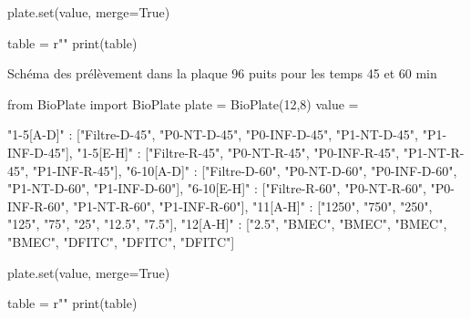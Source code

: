 \begin{enumerate}
\begin{table}[h]
\begin{pycode}
{}
plate.set(value, merge=True)

table = r""
print(table)
\end{pycode}
\label{table-prelevement-15-30}
\end{table}

\begin{table}[h]
\caption{Schéma des prélèvement dans la plaque 96 puits pour les temps 45 et 60 min}
\begin{pycode}

from BioPlate import BioPlate
plate = BioPlate(12,8)
value = {
    "1-5[A-D]" : ["Filtre-D-45", "P0-NT-D-45", "P0-INF-D-45", "P1-NT-D-45", "P1-INF-D-45"],
    "1-5[E-H]" : ["Filtre-R-45", "P0-NT-R-45", "P0-INF-R-45", "P1-NT-R-45", "P1-INF-R-45"],
    "6-10[A-D]" : ["Filtre-D-60", "P0-NT-D-60", "P0-INF-D-60", "P1-NT-D-60", "P1-INF-D-60"],
    "6-10[E-H]" : ["Filtre-R-60", "P0-NT-R-60", "P0-INF-R-60", "P1-NT-R-60", "P1-INF-R-60"],
    "11[A-H]" : ["1250", "750", "250", "125", "75", "25", "12.5", "7.5"],
    "12[A-H]" : ["2.5", "BMEC", "BMEC", "BMEC", "BMEC", "DFITC", "DFITC", "DFITC"]
    
}
plate.set(value, merge=True)

table = r""
print(table)
\end{pycode}
\label{table-prelevement-45-60}
\end{table}

\end{enumerate}